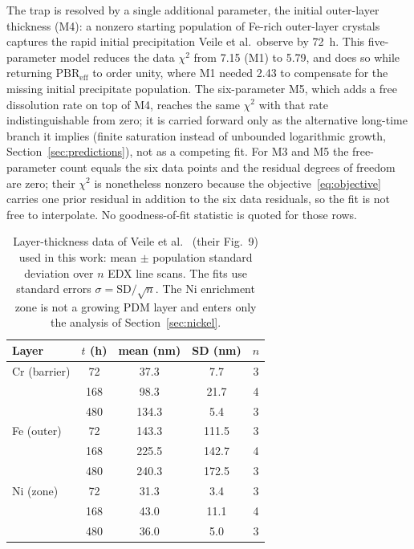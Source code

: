 \documentclass[preprint,12pt]{elsarticle}
\begin{document}
The trap is resolved by a single additional parameter, the initial
outer-layer thickness (M4): a nonzero starting population of Fe-rich
outer-layer crystals captures the rapid initial precipitation Veile et
al.\ observe by 72~h. This five-parameter model reduces the data
$\chi^2$ from 7.15 (M1) to 5.79, and does so while returning
$\mathrm{PBR}_\text{eff}$ to order unity, where M1 needed 2.43 to
compensate for the missing initial precipitate population. The six-parameter M5, which adds a
free dissolution rate on top of M4, reaches the same $\chi^2$ with that
rate indistinguishable from zero; it is carried forward only as the
alternative long-time branch it implies (finite saturation instead of
unbounded logarithmic growth, Section~\ref{sec:predictions}), not as a
competing fit. For M3 and M5 the free-parameter count equals the six
data points and the residual degrees of freedom are zero; their $\chi^2$
is nonetheless nonzero because the objective~\eqref{eq:objective} carries
one prior residual in addition to the six data residuals, so the fit is
not free to interpolate. No goodness-of-fit statistic is quoted for those
rows.

\begin{table}[htbp]
\centering
\caption{Layer-thickness data of Veile et al.~\citep{veile2024} (their
Fig.~9) used in this work: mean $\pm$ population standard deviation
over $n$ EDX line scans. The fits use standard errors
$\sigma = \mathrm{SD}/\sqrt{n}$. The Ni enrichment zone is not a
growing PDM layer and enters only the analysis of
Section~\ref{sec:nickel}.}
\label{tab:data}
\small
\begin{tabular}{lcccc}
\toprule
Layer & $t$ (h) & mean (nm) & SD (nm) & $n$ \\
\midrule
Cr (barrier) & 72 & 37.3 & 7.7 & 3 \\
 & 168 & 98.3 & 21.7 & 4 \\
 & 480 & 134.3 & 5.4 & 3 \\
Fe (outer) & 72 & 143.3 & 111.5 & 3 \\
 & 168 & 225.5 & 142.7 & 4 \\
 & 480 & 240.3 & 172.5 & 3 \\
Ni (zone) & 72 & 31.3 & 3.4 & 3 \\
 & 168 & 43.0 & 11.1 & 4 \\
 & 480 & 36.0 & 5.0 & 3 \\
\bottomrule
\end{tabular}
\end{table}
\end{document}
